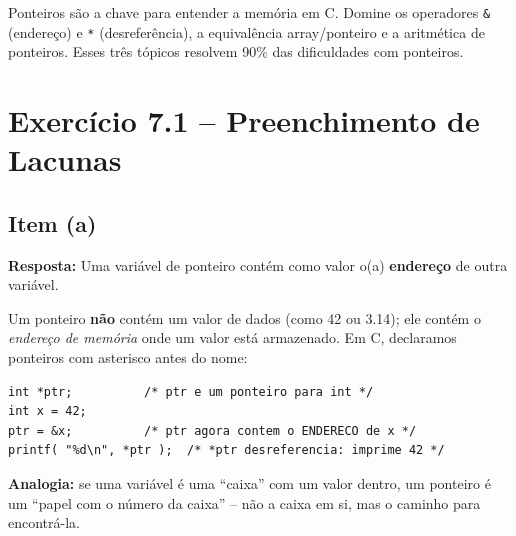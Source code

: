 \documentclass[12pt,a4paper]{article}
\begin{document}
\begin{boaprática}
  Ponteiros são a chave para entender a memória em C. Domine os operadores
  \texttt{\&} (endereço) e \texttt{*} (desreferência), a equivalência array/ponteiro
  e a aritmética de ponteiros. Esses três tópicos resolvem 90\% das dificuldades
  com ponteiros.
\end{boaprática}

\tableofcontents\newpage

\section{Exercício 7.1 -- Preenchimento de Lacunas}

\subsection*{Item (a)}
\begin{respostabox}
\textbf{Resposta:} Uma variável de ponteiro contém como valor o(a)
\textcolor{deitelblue}{\textbf{endereço}} de outra variável.

Um ponteiro \textbf{não} contém um valor de dados (como 42 ou 3.14); ele contém
o \textit{endereço de memória} onde um valor está armazenado. Em C, declaramos
ponteiros com asterisco antes do nome:
\begin{lstlisting}
int *ptr;          /* ptr e um ponteiro para int */
int x = 42;
ptr = &x;          /* ptr agora contem o ENDERECO de x */
printf( "%d\n", *ptr );  /* *ptr desreferencia: imprime 42 */
\end{lstlisting}

\textbf{Analogia:} se uma variável é uma ``caixa'' com um valor dentro, um ponteiro
é um ``papel com o número da caixa'' -- não a caixa em si, mas o caminho para
encontrá-la.
\end{respostabox}
\end{document}
